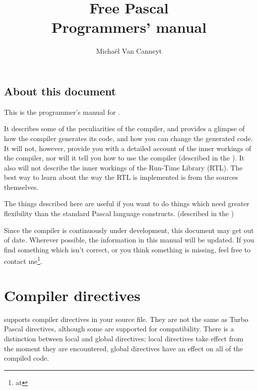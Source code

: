 \documentclass{report}
\begin{document}
\title{Free Pascal \\ Programmers' manual}

\author{Micha\"el Van Canneyt}
\maketitle
\tableofcontents
\newpage

\section*{About this document}
This is the programmer's manual for \fpc.

It describes some of the peculiarities of the \fpc compiler, and provides a
glimpse of how the compiler generates its code, and how you can change the
generated code. It will not, however, provide you with a detailed account of
the inner workings of the compiler, nor will it tell you how to use the
compiler (described in the \userref). It also will not describe the inner
workings of the Run-Time Library (RTL). The best way to learn about the way
the RTL is implemented is from the sources themselves.

The things described here are useful if you want to do things which need
greater flexibility than the standard Pascal language constructs.
(described in the )

Since the compiler is continuously under development, this document may get
out of date. Wherever possible, the information in this manual will be
updated. If you find something which isn't correct, or you think something
 is missing, feel free to contact me\footnote{at
}.

\chapter{Compiler directives}
\label{ch:CompSwitch}

\fpc supports compiler directives in your source file. They are not the same
as Turbo Pascal directives, although some are supported for compatibility.
There is a distinction between local and global directives; local directives
take effect from the moment they are encountered, global directives have an
effect on all of the compiled code.
\end{document}
